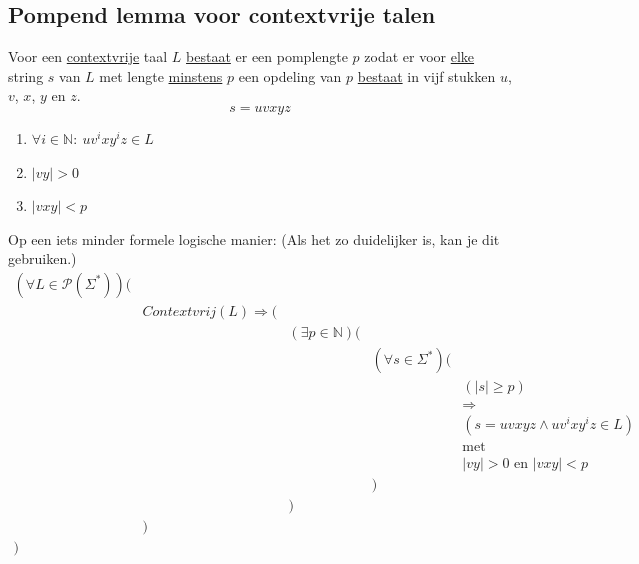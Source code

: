 \documentclass[main.tex]{subfiles}
\begin{document}


\subsection{Pompend lemma voor contextvrije talen}
\label{sec:pompend-lemma-voor-contextvrije-talen}

\begin{lem}
  Voor een \underline{contextvrije} taal $L$ \underline{bestaat} er een pomplengte $p$  zodat er voor \underline{elke} string $s$ van $L$ met lengte \underline{minstens} $p$ een opdeling van $p$ \underline{bestaat} in vijf stukken $u$, $v$, $x$, $y$ en $z$.
  \[ s = uvxyz \]
  \begin{enumerate}
    \item $\forall i \in \mathbb{N}:\ uv^{i}xy^{i}z \in L$
    \item $|vy| > 0$
    \item $|vxy| < p$
  \end{enumerate}
\end{lem}
Op een iets minder formele logische manier: (Als het zo duidelijker is, kan je dit gebruiken.)
\[
\begin{array}{rrrrl}
  (\forall L\in \mathcal{P}(\Sigma^{*})) (&\\
               & Contextvrij(L) \Rightarrow (&\\
               &                             & (\exists p\in \mathbb{N})(&\\
               &                             &                           &(\forall s \in \Sigma^{*})(&\\
               &                             &                           &                           & (|s| \ge p)\\
               &                             &                           &                           & \Rightarrow\\
               &                             &                           &                           & (s = uvxyz \wedge uv^{i}xy^{i}z \in L)\\
               &                             &                           &                           & \text{met}\\
               &                             &                           &                           & |vy| > 0 \text{ en } |vxy| < p\\
               &                             &                           &                          )&\\
               &                             &                          )&\\
               &                            )&\\
              )&\\ 
\end{array}
 \]
\end{document}
